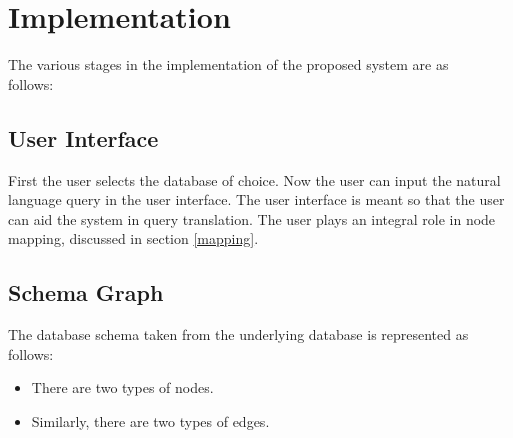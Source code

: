 \chapter{Implementation}


The various stages in the implementation of the proposed system are as\\ follows:\\

\section{User Interface}
First the user selects the database of choice. Now the user can input the natural language query in the user interface. The user interface is meant so that the user can aid the system in query translation. The user plays an integral role in node mapping, discussed in section \ref{mapping}.
\section{Schema Graph}
The database schema taken from the underlying database is represented as follows:
\begin{itemize}
\item There are two types of nodes. 
\item Similarly, there are two types of edges. 
\end{itemize}


